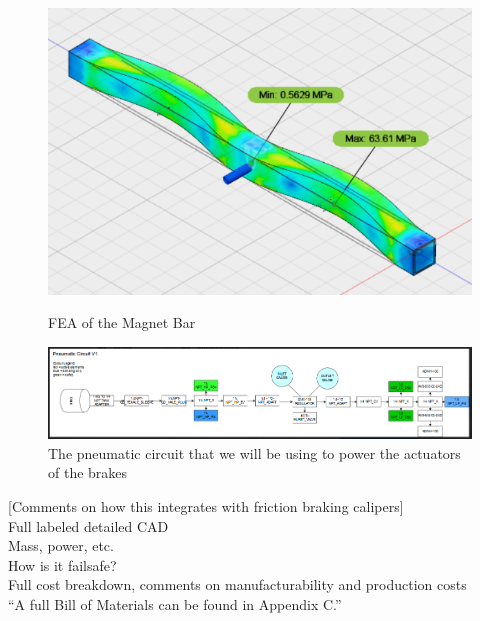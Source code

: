 \documentclass[main.tex]{subfiles}
\begin{document}
    \begin{figure}
    	\centering
        \includegraphics[width=\linewidth]{images/MagnetBarFEA}
        \label{fig:MagnetBar}
        \caption{FEA of the Magnet Bar}
    \end{figure}

     \begin{figure}
        \centering
        \includegraphics[width=\linewidth]{images/EC_Pnuematic_Circuit.png}
        \caption{The pneumatic circuit that we will be using to power the actuators of the brakes}
        \label{fig:pneumatic-circuit}
    \end{figure}
    
    [Comments on how this integrates with friction braking calipers]\\
    Full labeled detailed CAD\\
    Mass, power, etc.\\
    How is it failsafe?\\
    Full cost breakdown, comments on manufacturability and production costs\\
    “A full Bill of Materials can be found in Appendix C.”
\end{document}
